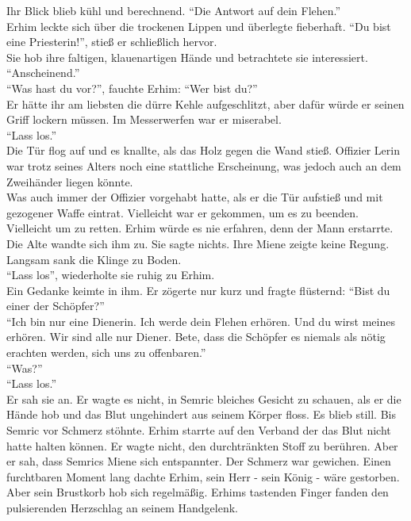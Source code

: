 Ihr Blick blieb kühl und berechnend. ``Die Antwort auf dein Flehen.''\\
Erhim leckte sich über die trockenen Lippen und überlegte fieberhaft. ``Du bist eine Priesterin!'', 
stieß er schließlich hervor.\\
Sie hob ihre faltigen, klauenartigen Hände und betrachtete sie interessiert. ``Anscheinend.''\\
``Was hast du vor?'', fauchte Erhim: ``Wer bist du?''\\
Er hätte ihr am liebsten die dürre Kehle aufgeschlitzt, aber dafür würde er seinen Griff lockern 
müssen. Im Messerwerfen war er miserabel.\\
``Lass los.''\\
Die Tür flog auf und es knallte, als das Holz gegen die Wand stieß. Offizier Lerin war trotz seines 
Alters noch eine stattliche Erscheinung, was jedoch auch an dem Zweihänder liegen könnte.\\
Was auch immer der Offizier vorgehabt hatte, als er die Tür aufstieß und mit gezogener Waffe 
eintrat. Vielleicht war er gekommen, um es zu beenden. Vielleicht um zu retten. Erhim würde es nie 
erfahren, denn der Mann erstarrte. Die Alte wandte sich ihm zu. Sie sagte nichts. Ihre Miene zeigte 
keine Regung. Langsam sank die Klinge zu Boden.\\
``Lass los'', wiederholte sie ruhig zu Erhim.\\
Ein Gedanke keimte in ihm. Er zögerte nur kurz und fragte flüsternd: ``Bist du einer der 
Schöpfer?''\\
``Ich bin nur eine Dienerin. Ich werde dein Flehen erhören. Und du wirst meines erhören. Wir sind 
alle nur Diener. Bete, dass die Schöpfer es niemals als nötig erachten werden, sich uns zu 
offenbaren.''\\
``Was?''\\
``Lass los.''\\
Er sah sie an. Er wagte es nicht, in Semric bleiches Gesicht zu schauen, als er die Hände hob und 
das Blut ungehindert aus seinem Körper floss. Es blieb still. Bis Semric vor Schmerz stöhnte. 
Erhim starrte auf den Verband der das Blut nicht hatte halten können. Er wagte nicht, den 
durchtränkten Stoff zu berühren. Aber er sah, dass Semrics Miene sich entspannter. Der Schmerz war 
gewichen. Einen furchtbaren Moment lang dachte Erhim, sein Herr - sein König - wäre gestorben. Aber 
sein Brustkorb hob sich regelmäßig. Erhims tastenden Finger fanden den pulsierenden Herzschlag an 
seinem Handgelenk.\\
